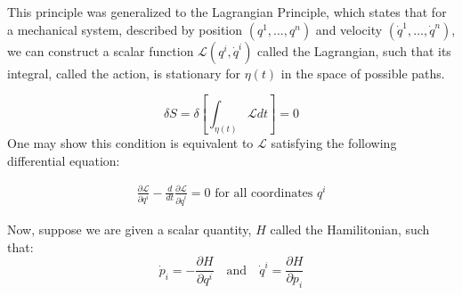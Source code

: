 \begin{center}
\end{center}

\noindent This principle was generalized to the Lagrangian Principle, which states that for a mechanical system, described by position $(q^{1}, \dots, q^{n})$ and velocity $(\dot{q}^{1}, \dots, \dot{q}^{n})$, we can construct a scalar function $\mathcal{L}(q^{i}, \dot{q}^{i})$ called the Lagrangian, such that its integral, called the action, is stationary for $\eta(t)$ in the space of possible paths. 

\begin{equation}
\delta S = \delta \left[ \int_{\eta(t)} \mathcal{L} dt \right] = 0
\tag{The Variational Principle}
\label{VariationalCondition}
\end{equation}
\noindent One may show this condition is equivalent to $\mathcal{L}$ satisfying the following differential equation: 

\begin{align}
\frac{\partial \mathcal{L}}{\partial q^{i}} - \frac{d}{dt} \frac{\partial \mathcal{L}}{\partial \dot{q}^{i}} = 0 \text{ for all coordinates } q^{i} 
\tag{The Euler-Lagrange Equations}
\end{align}

\noindent Now, suppose we are given a scalar quantity, $H$ called the Hamilitonian, such that:
\begin{equation}
    \dot{p}_i = -\frac{\partial H}{\partial q^i} 
    \quad \mbox{and} \quad 
    \dot{q}^i = \frac{\partial H}{\partial p_i}
\end{equation}

